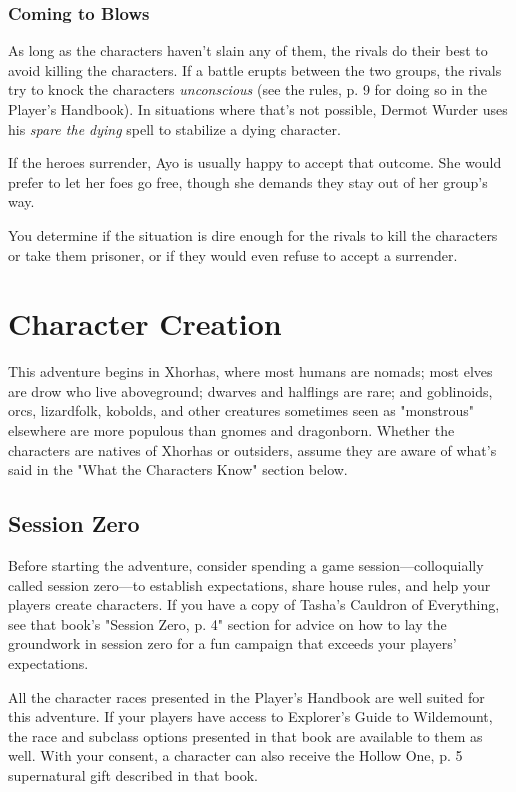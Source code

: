 \documentclass[a4paper, 11pt, bg=full, twocolumn, nooutline]{dndbook}
\begin{document}
\subsubsection{Coming to Blows}

As long as the characters haven't slain any of them, the rivals do their best to avoid killing the characters. If a battle erupts between the two groups, the rivals try to knock the characters \textit{unconscious} (see the rules, p. 9 for doing so in the Player's Handbook). In situations where that's not possible, Dermot Wurder uses his \textit{spare the dying} spell to stabilize a dying character.

If the heroes surrender, Ayo is usually happy to accept that outcome. She would prefer to let her foes go free, though she demands they stay out of her group's way.

You determine if the situation is dire enough for the rivals to kill the characters or take them prisoner, or if they would even refuse to accept a surrender.

\section{Character Creation}

This adventure begins in Xhorhas, where most humans are nomads; most elves are drow who live aboveground; dwarves and halflings are rare; and goblinoids, orcs, lizardfolk, kobolds, and other creatures sometimes seen as "monstrous" elsewhere are more populous than gnomes and dragonborn. Whether the characters are natives of Xhorhas or outsiders, assume they are aware of what's said in the "What the Characters Know" section below.

\subsection{Session Zero}

Before starting the adventure, consider spending a game session---colloquially called session zero---to establish expectations, share house rules, and help your players create characters. If you have a copy of Tasha's Cauldron of Everything, see that book's "Session Zero, p. 4" section for advice on how to lay the groundwork in session zero for a fun campaign that exceeds your players' expectations.

All the character races presented in the Player's Handbook are well suited for this adventure. If your players have access to Explorer's Guide to Wildemount, the race and subclass options presented in that book are available to them as well. With your consent, a character can also receive the Hollow One, p. 5 supernatural gift described in that book.
\end{document}
